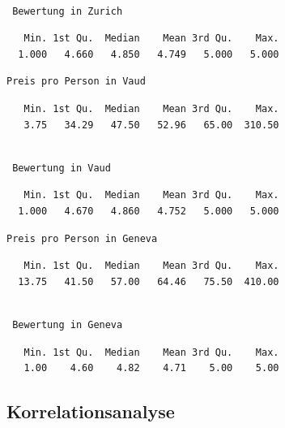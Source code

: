 \documentclass[
  journal,
]{IEEEtran}%
\begin{document}
\begin{verbatim}

 Bewertung in Zurich 
\end{verbatim}

\begin{verbatim}
   Min. 1st Qu.  Median    Mean 3rd Qu.    Max. 
  1.000   4.660   4.850   4.749   5.000   5.000 
\end{verbatim}

\begin{verbatim}
Preis pro Person in Vaud 
\end{verbatim}

\begin{verbatim}
   Min. 1st Qu.  Median    Mean 3rd Qu.    Max. 
   3.75   34.29   47.50   52.96   65.00  310.50 
\end{verbatim}

\begin{verbatim}

 Bewertung in Vaud 
\end{verbatim}

\begin{verbatim}
   Min. 1st Qu.  Median    Mean 3rd Qu.    Max. 
  1.000   4.670   4.860   4.752   5.000   5.000 
\end{verbatim}

\begin{verbatim}
Preis pro Person in Geneva 
\end{verbatim}

\begin{verbatim}
   Min. 1st Qu.  Median    Mean 3rd Qu.    Max. 
  13.75   41.50   57.00   64.46   75.50  410.00 
\end{verbatim}

\begin{verbatim}

 Bewertung in Geneva 
\end{verbatim}

\begin{verbatim}
   Min. 1st Qu.  Median    Mean 3rd Qu.    Max. 
   1.00    4.60    4.82    4.71    5.00    5.00 
\end{verbatim}

\hypertarget{korrelationsanalyse-1}{%
\subsection{\texorpdfstring{\textbf{Korrelationsanalyse}}{Korrelationsanalyse}}\label{korrelationsanalyse-1}}
\end{document}

